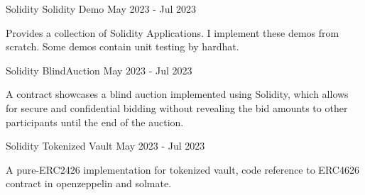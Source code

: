 

\begin{cventries}

  \cventry
	{Solidity} %
	{Solidity Demo} %
    {May 2023 - Jul 2023} %
    {} %
    {
      \begin{cvitems} %
        \item {Provides a collection of Solidity Applications. I implement these demos from scratch. Some demos contain unit testing by hardhat.}
      \end{cvitems}
    }
\cventry
{Solidity} %
{BlindAuction} %
{May 2023 - Jul 2023} %
{} %
{
	\begin{cvitems} %
		\item {A contract showcases a blind auction implemented using Solidity, which allows for secure and confidential bidding without revealing the bid amounts to other participants until the end of the auction.}
	\end{cvitems}
}
  \cventry
{Solidity} %
{Tokenized Vault} %
{May 2023 - Jul 2023} %
{} %
{
	\begin{cvitems} %
		\item {A pure-ERC2426 implementation for tokenized vault, code reference to ERC4626 contract in openzeppelin and solmate.}
	\end{cvitems}
}

\end{cventries}
